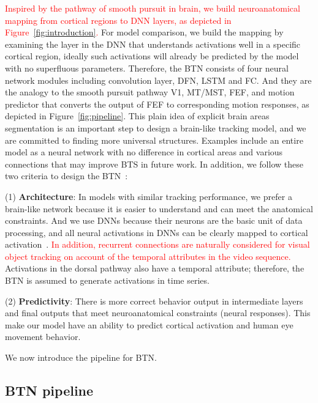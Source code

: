 \documentclass[final,3p,times,twocolumn]{elsarticle}
\begin{document}
\textcolor{red}{
Inspired by the pathway of smooth pursuit in brain, we build neuroanatomical mapping from cortical regions to DNN layers, as depicted in Figure~\ref{fig:introduction}.}
For model comparison, we build the mapping by examining the layer in the DNN that understands activations well in a specific cortical region, 
ideally such activations will already be predicted by the model with no superfluous parameters. 
Therefore, the BTN consists of four neural network modules including convolution layer, DFN, LSTM and FC.
And they are the analogy to the smooth pursuit pathway V1, MT/MST, FEF, 
and motion predictor that converts the output of FEF to corresponding motion responses, as depicted in Figure~\ref{fig:pipeline}. 
This plain idea of explicit brain areas segmentation is an important step to design a brain-like tracking model, 
and we are committed to finding more universal structures. 
Examples include an entire model as a neural network with no difference in cortical areas
and various connections that may improve BTS in future work.
In addition, we follow these two criteria to design the BTN~\cite{kubilius2018predict}:

(1) \textbf{Architecture}: In models with similar tracking performance, we prefer a brain-like network because it is easier to understand and can meet the anatomical constraints.
And we use DNNs because their neurons are the basic unit of data processing, 
and all neural activations in DNNs can be clearly mapped to cortical activation~\cite{yamins2016using}.
\textcolor{red}{
In addition, recurrent connections are naturally considered for visual object tracking on account of the temporal attributes in the video sequence.}
Activations in the dorsal pathway also have a temporal attribute; 
therefore, the BTN is assumed to generate activations in time series.

(2) \textbf{Predictivity}: 
There is more correct behavior output in intermediate layers and final outputs that meet neuroanatomical constraints (neural responses). 
This make our model have an ability to predict cortical activation and human eye movement behavior.

We now introduce the pipeline for BTN. 


\subsection{BTN pipeline} \label{sec:cornet_s_def}
\end{document}

